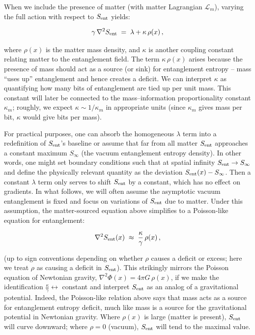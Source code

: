 \documentclass[11pt]{article}
\begin{document}
When we include the presence of matter (with matter Lagrangian $\mathcal{L}_m$), varying the full action with respect to $S_{\rm ent}$ yields:

\begin{equation}
\gamma\, \nabla^2 S_{\rm ent} \;=\; \lambda + \kappa\,\rho(x) \,,
\end{equation}

where $\rho(x)$ is the matter mass density, and $\kappa$ is another coupling constant relating matter to the entanglement field. The term $\kappa\,\rho(x)$ arises because the presence of mass should act as a source (or sink) for entanglement entropy – mass “uses up” entanglement and hence creates a deficit. We can interpret $\kappa$ as quantifying how many bits of entanglement are tied up per unit mass. This constant will later be connected to the mass–information proportionality constant $\kappa_m$; roughly, we expect $\kappa \sim 1/\kappa_m$ in appropriate units (since $\kappa_m$ gives mass per bit, $\kappa$ would give bits per mass).

For practical purposes, one can absorb the homogeneous $\lambda$ term into a redefinition of $S_{\rm ent}$’s baseline or assume that far from all matter $S_{\rm ent}$ approaches a constant maximum $S_\infty$ (the vacuum entanglement entropy density). In other words, one might set boundary conditions such that at spatial infinity $S_{\rm ent}\to S_{\infty}$ and define the physically relevant quantity as the deviation $S_{\rm ent}(x) - S_{\infty}$. Then a constant $\lambda$ term only serves to shift $S_{\rm ent}$ by a constant, which has no effect on gradients. In what follows, we will often assume the asymptotic vacuum entanglement is fixed and focus on variations of $S_{\rm ent}$ due to matter. Under this assumption, the matter-sourced equation above simplifies to a Poisson-like equation for entanglement:

\begin{equation}
\nabla^2 S_{\rm ent}(x) \;\approx\; \frac{\kappa}{\gamma}\,\rho(x) \,,
\end{equation}

(up to sign conventions depending on whether $\rho$ causes a deficit or excess; here we treat $\rho$ as causing a deficit in $S_{\rm ent}$). This strikingly mirrors the Poisson equation of Newtonian gravity, $\nabla^2 \Phi(x) = 4\pi G\,\rho(x)$, if we make the identification $\frac{\kappa}{\gamma} \leftrightarrow$ constant and interpret $S_{\rm ent}$ as an analog of a gravitational potential. Indeed, the Poisson-like relation above says that mass acts as a source for entanglement entropy deficit, much like mass is a source for the gravitational potential in Newtonian gravity. Where $\rho(x)$ is large (matter is present), $S_{\rm ent}$ will curve downward; where $\rho=0$ (vacuum), $S_{\rm ent}$ will tend to the maximal value.
\end{document}
